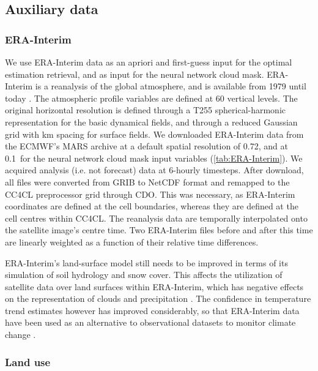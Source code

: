 \subsection{Auxiliary data}

\subsubsection{ERA-Interim}\label{sec:ERA-Interim}

We use ERA-Interim data as an apriori and first-guess input for the optimal estimation retrieval, and as input for the neural network cloud mask. ERA-Interim is a reanalysis of the global atmosphere, and is available from 1979 until today \citep{ERAInterim,Dee11}. The atmospheric profile variables are defined at 60 vertical levels. The original horizontal resolution is defined through a T255 spherical-harmonic representation for the basic dynamical fields, and through a reduced Gaussian grid with  km spacing for surface fields. We downloaded ERA-Interim data from the ECMWF's MARS archive at a default spatial resolution of 0.72\textdegree, and at 0.1\textdegree\ for the neural network cloud mask input variables (\autoref{tab:ERA-Interim}). We acquired analysis (i.e. not forecast) data at 6-hourly timesteps. After download, all files were converted from GRIB to NetCDF format and remapped to the CC4CL preprocessor grid through CDO. This was necessary, as ERA-Interim coordinates are defined at the cell boundaries, whereas they are defined at the cell centres within CC4CL. The reanalysis data are temporally interpolated onto the satellite image's centre time. Two ERA-Interim files before and after this time are linearly weighted as a function of their relative time differences.

ERA-Interim's land-surface model still needs to be improved in terms of its simulation of soil hydrology and snow cover. This affects the utilization of satellite data over land surfaces within ERA-Interim, which has negative effects on the representation of clouds and precipitation \citep{ERAInterim}. The confidence in temperature trend estimates however has improved considerably, so that ERA-Interim data have been used as an alternative to observational datasets to monitor climate change \citep{Willett10}.

\subsubsection{Land use}\label{sec:USGS}

